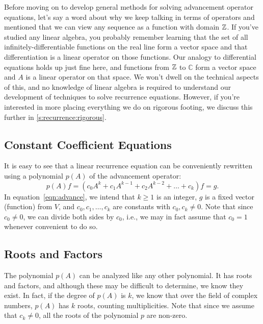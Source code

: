 Before moving on to develop general methods for solving advancement
operator equations, let's say a word about why we keep talking in
terms of operators and mentioned that we can view any sequence as a
function with domain $\mathbb{Z}$. If you've studied any linear algebra, you
probably remember learning that the set of all
infinitely-differentiable functions on the real line form a vector
space and that differentiation is a linear operator on those
functions. Our analogy to differential equations holds up just fine
here, and functions from $\mathbb{Z}$ to $\mathbb{C}$ form a vector space and $A$ is a
linear operator on that space. We won't dwell on the technical aspects
of this, and no knowledge of linear algebra is required to understand
our development of techniques to solve recurrence equations. However,
if you're interested in more placing everything we do on rigorous
footing, we discuss this further in \autoref{s:recurrence:rigorous}.

\subsection{Constant Coefficient Equations}\label{s:recurrence:adv-ops:const-coeff}

It is easy to see that a linear recurrence equation can be
conveniently rewritten using a polynomial $p(A)$ of the 
advancement operator:
\begin{equation}\label{eqn:advance}
p(A)f=(c_0A^{k}+ c_1A^{k-1} + c_2A^{k-2} + \dots+c_k)f = g.
\end{equation} 
In equation~\ref{eqn:advance}, we intend that $k\ge1$ is an integer,
$g$ is a fixed vector (function) from $V$, and $c_0,c_1,\dots,
c_k$ are constants with $c_0,c_k\neq0$.  Note that since $c_0\neq0$,
we can divide both sides by $c_0$, i.e., we may in fact assume
that $c_0=1$ whenever convenient to do so.

\subsection{Roots and Factors}\label{s:recurrence:adv-ops:roots-factors}

The polynomial $p(A)$ can be analyzed like any other polynomial.
It has roots and factors, and although these may be difficult to
determine, we know they exist.  In fact, if the degree of $p(A)$ 
is $k$, we know that over the field of complex numbers, $p(A)$
has $k$ roots, counting multiplicities.  Note that since we assume
that $c_k\neq0$, all the roots of the polynomial $p$ are non-zero.


